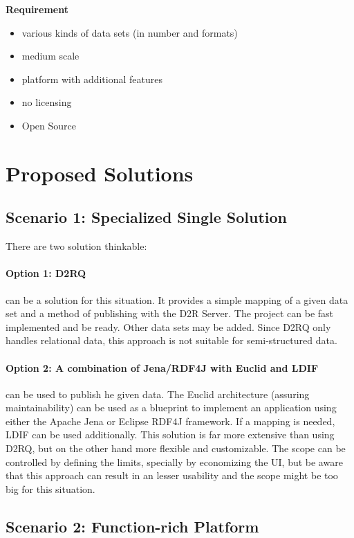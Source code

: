 \textbf{Requirement}
\begin{itemize}
\itemsep0pt
\item various kinds of data sets (in number and formats)
\item medium scale
\item platform with additional features
\item no licensing
\item Open Source
\end{itemize}

\section{Proposed Solutions}

\subsection{Scenario 1: Specialized Single Solution}

There are two solution thinkable:

\paragraph{Option 1: D2RQ} can be a solution for this situation. It provides a simple mapping of a given data set and a method of publishing with the D2R Server. The project can be fast implemented and be ready. Other data sets may be added. Since D2RQ only handles relational data, this approach is not suitable for semi-structured data.

\paragraph{Option 2: A combination of Jena/RDF4J with Euclid and LDIF} can be used to publish he given data. The Euclid architecture (assuring maintainability) can be used as a blueprint to implement an application using either the Apache Jena or Eclipse RDF4J framework. If a mapping is needed, LDIF can be used additionally. This solution is far more extensive than using D2RQ, but on the other hand more flexible and customizable. The scope can be controlled by defining the limits, specially by economizing the UI, but be aware that this approach can result in an lesser usability and the scope might be too big for this situation.

\subsection{Scenario 2: Function-rich Platform}


